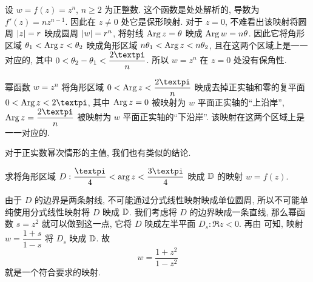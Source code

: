 设 $w=f(z)=z^n$, $n\ge2$ 为正整数.
这个函数是处处解析的, 导数为 $f'(z)=nz^{n-1}$.
因此在 $z\neq0$ 处它是保形映射.
对于 $z=0$, 不难看出该映射将圆周 $\lvert z\rvert=r$ 映成圆周 $\lvert w\rvert=r^n$, 将射线 $\operatorname{Arg} z=\theta$ 映成 $\operatorname{Arg} w=n\theta$.
因此它将角形区域 $\theta_1<\operatorname{Arg} z<\theta_2$ 映成角形区域 $n\theta_1<\operatorname{Arg} z<n\theta_2$, 且在这两个区域上是一一对应的, 其中 $0<\theta_2-\theta_1<\dfrac{2\cpi}n$.
所以 $w=z^n$ 在 $z=0$ 处没有保角性.

幂函数 $w=z^n$ 将角形区域 $0<\Arg z<\dfrac{2\cpi}n$ 映成去掉正实轴和零的复平面 $0<\Arg z<2\cpi$, 其中 $\operatorname{Arg} z=0$ 被映射为 $w$ 平面正实轴的``上沿岸'', $\Arg z=\dfrac{2\cpi}n$ 被映射为 $w$ 平面正实轴的``下沿岸''.
该映射在这两个区域上是一一对应的.

对于正实数幂次情形的主值, 我们也有类似的结论.

\begin{example}
  求将角形区域 $D:\dfrac\cpi4<\arg z<\dfrac{3\cpi}4$ 映成 ${\mathbb{D}}$ 的映射 $w=f(z)$.
\end{example}

\begin{solution}
  由于 $D$ 的边界是两条射线, 不可能通过分式线性映射映成单位圆周, 所以不可能单纯使用分式线性映射将 $D$ 映成 ${\mathbb{D}}$.
  我们考虑将 $D$ 的边界映成一条直线, 那么幂函数 $s=z^2$ 就可以做到这一点, 它将 $D$ 映成左半平面 $D_s:\Re z<0$.
  再由 可知, 映射 $w=\dfrac{1+s}{1-s}$ 将 $D_s$ 映成 ${\mathbb{D}}$.
  故
  \[
    w=\frac{1+z^2}{1-z^2}
  \]
  就是一个符合要求的映射.
\end{solution}

